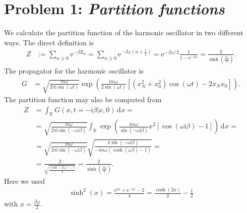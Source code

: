 \documentclass[english, parskip=full]{scrartcl}
\title{\titel}
\author{\autor}
\date{\today}
\newcommand{\intr}{}
\newcommand{\kla}{}
\newcommand{\klam}{}
\renewcommand{\i}{\text{i}}
\newcommand{\e}{\text{e}}
\begin{document}
\maketitle  %

\section*{Problem 1: \normalfont\textit{\large{Partition functions}}}
We calculate the partition function of the harmonic oscillator in two different ways.
The direct definition is
\begin{align}
Z &:= \sum_{n\ge 0}\e^{-\beta E_n} = \sum_{n\ge 0}\e^{-\beta\omega \kla\left( n+\frac{1}{2} \right)} = \e^{-\beta\omega/2} \frac{1}{1 - \e^{-\beta\omega}} = \frac{2}{\sinh\kla\left( \frac{\beta\omega}{2} \right)}.
\end{align}
The propagator for the harmonic oscillator is
\begin{align}
G &= \sqrt{\frac{m\omega}{2\pi\i\sin (\omega t)}} \exp\kla\left( \frac{\i m \omega}{2\sin (\omega t)}\klam\left[ (x_N^2 + x_0^2)\cos(\omega t) - 2x_Nx_0 \right] \right).
\end{align}
The partition function may also be computed from
\begin{align}
Z &= \intr\int_{\mathbb{R}^{ }} G(x, t=-\i\beta | x, 0) \, \mathrm{d}^{ }x = \\
&= \sqrt{\frac{m\omega}{2\pi\i\sin(-\omega \i\beta)}} \intr\int_{\mathbb{R}^{ }} \exp\kla\left( \frac{\i m\omega}{\sin (-\omega \i\beta)} x^2\klam\left[ \cos(\omega \i\beta) - 1 \right] \right) \, \mathrm{d}^{ }x = \\
&= \sqrt{\frac{m\omega}{2\pi\i\sin(-\omega \i\beta)}} \sqrt{\frac{\pi \sin(-\omega\i\beta)}{-\i m\omega \kla\left( \cosh(\omega\beta) - 1 \right)}} = \\
&= \frac{2}{\sqrt{\frac{\cosh(\beta\omega) - 1}{2}}} = \frac{2}{\sinh\kla\left( \frac{\beta\omega}{2} \right)}.
\end{align}
Here we used
\begin{align}
\sinh^2(x) = \frac{\e^{2x} + \e^{-2x} - 2}{4} = \frac{\cosh(2x)}{2} - \frac{1}{2}
\end{align}
with $x = \frac{\beta\omega}{2}$.
\end{document}
